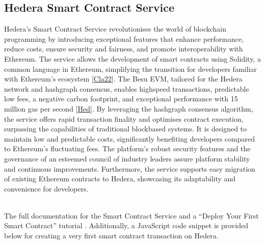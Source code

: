 \documentclass[letterpaper,10pt,english]{jupyterBook}
\begin{document}
\subsection{Hedera Smart Contract Service}
\label{\detokenize{HED/hed:hedera-smart-contract-service}}
\sphinxAtStartPar
Hedera’s Smart Contract Service revolutionises the world of blockchain programming by introducing exceptional features that enhance performance, reduce costs, ensure security and fairness, and promote interoperability with Ethereum. The service allows the development of smart contracts using Solidity, a common language in Ethereum, simplifying the transition for developers familiar with Ethereum’s ecosystem {[}\hyperlink{cite.HED/hed:id125}{Cla22}{]}. The Besu EVM, tailored for the Hedera network and hashgraph consensus, enables high\sphinxhyphen{}speed transactions, predictable low fees, a negative carbon footprint, and exceptional performance with 15 million gas per second {[}\hyperlink{cite.HED/hed:id126}{Hed}{]}. By leveraging the hashgraph consensus algorithm, the service offers rapid transaction finality and optimises contract execution, surpassing the capabilities of traditional block\sphinxhyphen{}based systems. It is designed to maintain low and predictable costs, significantly benefiting developers compared to Ethereum’s fluctuating fees. The platform’s robust security features and the governance of an esteemed council of industry leaders assure platform stability and continuous improvements. Furthermore, the service supports easy migration of existing Ethereum contracts to Hedera, showcasing its adaptability and convenience for developers.


\nopagebreak


\sphinxAtStartPar
\\
The full documentation for the Smart Contract Service and a “Deploy Your First Smart Contract” tutorial .
Additionally, a JavaScript code snippet is provided below for creating a very first smart contract transaction on Hedera.
\end{document}
